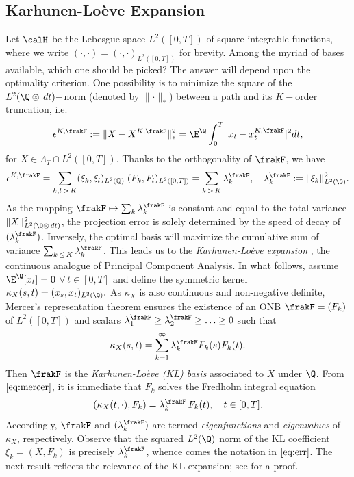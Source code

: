 \subsection{Karhunen-Loève Expansion}\label{ssec:KL}
Let $\calH$ be the Lebesgue space $L^2([0,T])$ of square-integrable functions, where  we write 
$(\cdot,\cdot) = (\cdot,\cdot)_{L^2([0,T])} $ for brevity. 
Among the myriad of bases available, which one should be picked? The answer will depend upon the optimality criterion. One possibility is to minimize the square of the $L^2(\Q \otimes \, dt)-$norm (denoted by $\lVert \cdot \rVert_{*}$) between a path and its $K-$order  truncation, i.e. 
$$\epsilon^{K,\frakF} := \lVert X - X^{K,\frakF}\rVert^2_{*} = \E^{\Q} \int_0^T |
x_t - x^{K,\frakF}_t|^2 dt,$$
for $X \in \Lambda_T \cap L^2([0,T])$. 
Thanks to the orthogonality of $\frakF$,  we have 
\begin{equation}\label{eq:err}
   \epsilon^{K,\frakF} = \sum_{k,l \, > \, K}(\xi_k,\xi_l)_{L^2(\mathbb{Q})} \;(F_k,F_l)_{L^2([0,T])}  = \sum_{k \, > \, K} \lambda^{\frakF}_k , \quad \lambda^{\frakF}_k :=  \lVert  \xi_k\rVert^2_{L^2(\Q)}. 
\end{equation}
As  the mapping 
$\frakF \mapsto \sum_{k} \lambda^{\frakF}_k  $ is  constant and equal to the total variance $\lVert X\rVert^2_{L^2(\Q \otimes \, dt)}$, the projection error is solely determined by the speed of decay of  $(\lambda^{\frakF }_k)$. Inversely, the optimal basis will maximize the cumulative sum of  variance $\sum_{k \, \le \, K} \lambda^{\frakF}_k$.
This leads us to the \textit{Karhunen-Loève expansion} \cite{Karhunen,Loeve}, the continuous analogue of Principal Component Analysis. 
In what follows, assume  $\E^{\Q}[x_t]=0$ $\forall \, t \in [0,T]$ and define the symmetric kernel $\kappa_X(s,t) = (x_s, x_t)_{L^2(\Q)}.$ 
As $\kappa_X$ is also continuous and non-negative definite, Mercer's representation theorem \cite{FB/Mercer} ensures the existence of  an ONB $\frakF=(F_k)$ of $L^2([0,T])$ and scalars $\lambda_1^{\frakF} \ge \lambda_2^{\frakF} \ge \ldots \ge 0$ such that 
\begin{equation}\label{eq:mercer}
    \kappa_X(s,t)= \sum_{k=1}^{\infty} \lambda^{\frakF}_k F_k(s) F_k(t).
\end{equation}
Then $\frakF$ is the \textit{Karhunen-Loève (KL) basis} associated to $X$ under $\Q$. 
From $\eqref{eq:mercer}$, it is immediate  that   $F_k$ solves the Fredholm integral equation
 $$(\kappa_X(t,\cdot),F_k) = \lambda_k^{\frakF}\,  F_k(t), \quad  t\in [0,T].$$ Accordingly, 
 $\frakF$ and $(\lambda_k^{\frakF})$ are  termed \textit{eigenfunctions} and \textit{eigenvalues} of $\kappa_X$, respectively.  
Observe that the squared $L^2(\Q)$ norm of the KL coefficient $\xi_k=(X,F_k)$ is precisely $\lambda_k^{\frakF}$, whence comes the notation in $\eqref{eq:err}$. 
The next result reflects the relevance of the KL expansion; see \cite[Theorem 2.1.2.]{Ghanem} for a proof.

